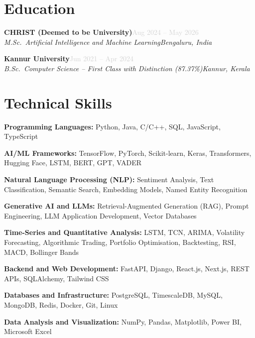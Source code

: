 \documentclass[a4paper,10.5pt]{article}
\newcommand{\resumeEntry}[4]{%
  \vspace{3pt}%
  \noindent\textbf{\normalsize #1}\hfill\textcolor{lightgray}{\small #2}\\%
  \noindent\textit{\small #3}\hfill\textit{\small #4}%
  \vspace{2pt}%
}
\begin{document}

\section{Education}

\resumeEntry
  {CHRIST (Deemed to be University)}{Aug 2024 -- May 2026}
  {M.Sc.\ Artificial Intelligence and Machine Learning}{Bengaluru, India}

\vspace{6pt}

\resumeEntry
  {Kannur University}{Jun 2021 -- Apr 2024}
  {B.Sc.\ Computer Science -- First Class with Distinction (87.37\%)}{Kannur, Kerala}


\section{Technical Skills}

\small{
\noindent\textbf{Programming Languages:} Python, Java, C/C++, SQL, JavaScript, TypeScript

\vspace{4pt}
\noindent\textbf{AI/ML Frameworks:} TensorFlow, PyTorch, Scikit-learn, Keras, Transformers, Hugging Face, LSTM, BERT, GPT, VADER

\vspace{4pt}
\noindent\textbf{Natural Language Processing (NLP):} Sentiment Analysis, Text Classification, Semantic Search, Embedding Models, Named Entity Recognition

\vspace{4pt}
\noindent\textbf{Generative AI and LLMs:} Retrieval-Augmented Generation (RAG), Prompt Engineering, LLM Application Development, Vector Databases

\vspace{4pt}
\noindent\textbf{Time-Series and Quantitative Analysis:} LSTM, TCN, ARIMA, Volatility Forecasting, Algorithmic Trading, Portfolio Optimisation, Backtesting, RSI, MACD, Bollinger Bands

\vspace{4pt}
\noindent\textbf{Backend and Web Development:} FastAPI, Django, React.js, Next.js, REST APIs, SQLAlchemy, Tailwind CSS

\vspace{4pt}
\noindent\textbf{Databases and Infrastructure:} PostgreSQL, TimescaleDB, MySQL, MongoDB, Redis, Docker, Git, Linux

\vspace{4pt}
\noindent\textbf{Data Analysis and Visualization:} NumPy, Pandas, Matplotlib, Power BI, Microsoft Excel
}
\end{document}
